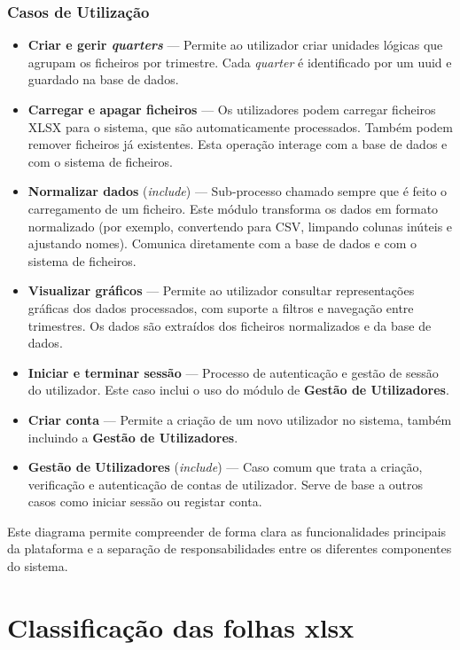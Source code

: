 \subsection*{Casos de Utilização}
\begin{itemize}
    \item \textbf{Criar e gerir \textit{quarters}} — Permite ao utilizador criar unidades lógicas que agrupam os ficheiros por trimestre. Cada \textit{quarter} é identificado por um \gls{uuid} e guardado na base de dados.
    \item \textbf{Carregar e apagar ficheiros} — Os utilizadores podem carregar ficheiros XLSX para o sistema, que são automaticamente processados. Também podem remover ficheiros já existentes. Esta operação interage com a base de dados e com o sistema de ficheiros.
    \item \textbf{Normalizar dados} (\textit{include}) — Sub-processo chamado sempre que é feito o carregamento de um ficheiro. Este módulo transforma os dados em formato normalizado (por exemplo, convertendo para CSV, limpando colunas inúteis e ajustando nomes). Comunica diretamente com a base de dados e com o sistema de ficheiros.
    \item \textbf{Visualizar gráficos} — Permite ao utilizador consultar representações gráficas dos dados processados, com suporte a filtros e navegação entre trimestres. Os dados são extraídos dos ficheiros normalizados e da base de dados.
    \item \textbf{Iniciar e terminar sessão} — Processo de autenticação e gestão de sessão do utilizador. Este caso inclui o uso do módulo de \textbf{Gestão de Utilizadores}.
    \item \textbf{Criar conta} — Permite a criação de um novo utilizador no sistema, também incluindo a \textbf{Gestão de Utilizadores}.
    \item \textbf{Gestão de Utilizadores} (\textit{include}) — Caso comum que trata a criação, verificação e autenticação de contas de utilizador. Serve de base a outros casos como iniciar sessão ou registar conta.
\end{itemize}

Este diagrama permite compreender de forma clara as funcionalidades principais da plataforma e a separação de responsabilidades entre os diferentes componentes do sistema.

\chapter{Classificação das folhas \gls{xlsx}}


